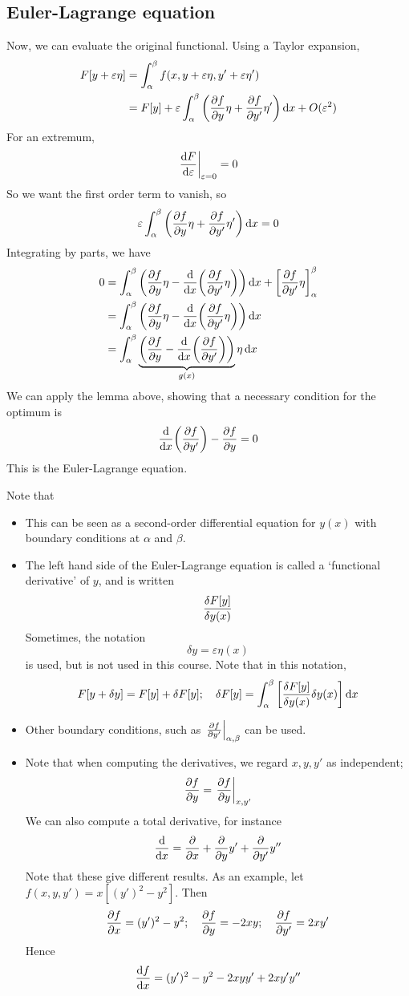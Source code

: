\subsection{Euler-Lagrange equation}
Now, we can evaluate the original functional.
Using a Taylor expansion,
\begin{align*}
	F[y + \varepsilon \eta] & = \int_\alpha^\beta f(x, y+\varepsilon\eta, y'+\varepsilon\eta')                                        \\
	                        & = F[y] + \varepsilon\int_\alpha^\beta \qty(\pdv{f}{y}\eta + \pdv{f}{y'}\eta') \dd{x} + O(\varepsilon^2)
\end{align*}
For an extremum,
\[
	\eval{\dv{F}{\varepsilon}}_{\varepsilon = 0} = 0
\]
So we want the first order term to vanish, so
\[
	\varepsilon\int_\alpha^\beta \qty(\pdv{f}{y}\eta + \pdv{f}{y'}\eta') \dd{x} = 0
\]
Integrating by parts, we have
\begin{align*}
	0 & = \int_\alpha^\beta \qty(\pdv{f}{y}\eta - \dv{x} \qty(\pdv{f}{y'}\eta)) \dd{x} + \qty[\pdv{f}{y'}\eta]_\alpha^\beta \\
	  & = \int_\alpha^\beta \qty(\pdv{f}{y}\eta - \dv{x} \qty(\pdv{f}{y'}\eta)) \dd{x}                                      \\
	  & = \int_\alpha^\beta \underbrace{\qty(\pdv{f}{y} - \dv{x} \qty(\pdv{f}{y'}))}_{g(x)} \eta \dd{x}
\end{align*}
We can apply the lemma above, showing that a necessary condition for the optimum is
\[
	\dv{x} \qty(\pdv{f}{y'}) - \pdv{f}{y} = 0
\]
This is the Euler-Lagrange equation.
\begin{remark}
	Note that
	\begin{itemize}
		\item This can be seen as a second-order differential equation for \(y(x)\) with boundary conditions at \(\alpha\) and \(\beta\).
		\item The left hand side of the Euler-Lagrange equation is called a `functional derivative' of \(y\), and is written
		      \[
			      \fdv{F[y]}{y(x)}
		      \]
		      Sometimes, the notation
		      \[
			      \delta y = \varepsilon\eta(x)
		      \]
		      is used, but is not used in this course.
		      Note that in this notation,
		      \[
			      F[y + \delta y] = F[y] + \delta F[y];\quad \delta F[y] = \int_\alpha^\beta \qty[\fdv{F[y]}{y(x)} \delta y(x)]\dd{x}
		      \]
		\item Other boundary conditions, such as \(\eval{\pdv{f}{y'}}_{\alpha, \beta}\) can be used.
		\item Note that when computing the derivatives, we regard \(x, y, y'\) as independent;
		      \[
			      \pdv{f}{y} = \eval{\pdv{f}{y}}_{x, y'}
		      \]
		      We can also compute a total derivative, for instance
		      \[
			      \dv{x} = \pdv{x} + \pdv{y}y' + \pdv{y'}y''
		      \]
		      Note that these give different results.
		      As an example, let \(f(x, y, y') = x[(y')^2 - y^2]\).
		      Then
		      \[
			      \pdv{f}{x} = (y')^2 - y^2;\quad \pdv{f}{y} = -2xy;\quad \pdv{f}{y'} = 2xy'
		      \]
		      Hence
		      \[
			      \dv{f}{x} = (y')^2 - y^2 - 2xyy' + 2xy'y''
		      \]
	\end{itemize}
\end{remark}

